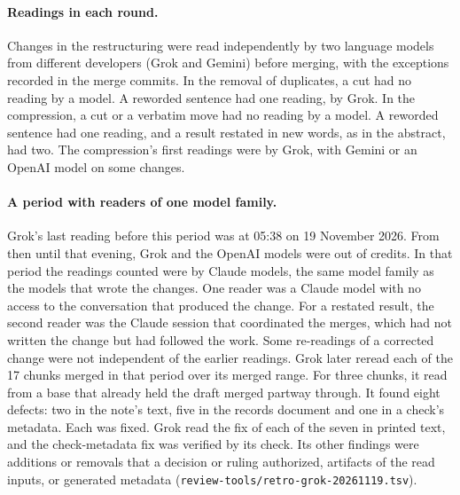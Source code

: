 \paragraph{Readings in each round.} Changes in the restructuring were read independently by two language models from different developers (Grok and Gemini) before merging, with the exceptions recorded in the merge commits. In the removal of duplicates, a cut had no reading by a model. A reworded sentence had one reading, by Grok. In the compression, a cut or a verbatim move had no reading by a model. A reworded sentence had one reading, and a result restated in new words, as in the abstract, had two. The compression's first readings were by Grok, with Gemini or an OpenAI model on some changes.

\paragraph{A period with readers of one model family.} Grok's last reading before this period was at 05:38 on 19 November 2026. From then until that evening, Grok and the OpenAI models were out of credits. In that period the readings counted were by Claude models, the same model family as the models that wrote the changes. One reader was a Claude model with no access to the conversation that produced the change. For a restated result, the second reader was the Claude session that coordinated the merges, which had not written the change but had followed the work. Some re-readings of a corrected change were not independent of the earlier readings. Grok later reread each of the 17 chunks merged in that period over its merged range. For three chunks, it read from a base that already held the draft merged partway through. It found eight defects: two in the note's text, five in the records document and one in a check's metadata. Each was fixed. Grok read the fix of each of the seven in printed text, and the check-metadata fix was verified by its check. Its other findings were additions or removals that a decision or ruling authorized, artifacts of the read inputs, or generated metadata (\texttt{review-tools/retro-grok-20261119.tsv}).


